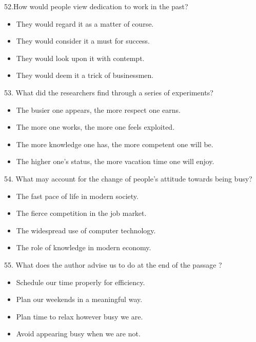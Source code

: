 \documentclass[UTF8,11pt]{ctexart}
\begin{document}
52.How would people view dedication to work in the past?


\begin{itemize}[leftmargin=2em,itemsep=.2em,topsep=.4em]\item[A.] They would regard it as a matter of course.
\item[B.] They would consider it a must for success.
\item[C.] They would look upon it with contempt.
\item[D.] They would deem it a trick of businessmen.
\end{itemize}

53. What did the researchers find through a series of experiments?


\begin{itemize}[leftmargin=2em,itemsep=.2em,topsep=.4em]\item[A.] The busier one appears, the more respect one earns.
\item[B.] The more one works, the more one feels exploited.
\item[C.] The more knowledge one has, the more competent one will be.
\item[D.] The higher one’s status, the more vacation time one will enjoy.
\end{itemize}

54. What may account for the change of people’s attitude towards being busy?


\begin{itemize}[leftmargin=2em,itemsep=.2em,topsep=.4em]\item[A.] The fast pace of life in modern society.
\item[B.] The fierce competition in the job market.
\item[C.] The widespread use of computer technology.
\item[D.] The role of knowledge in modern economy.
\end{itemize}

55. What does the author advise us to do at the end of the passage ?


\begin{itemize}[leftmargin=2em,itemsep=.2em,topsep=.4em]\item[A.] Schedule our time properly for efficiency.
\item[B.] Plan our weekends in a meaningful way.
\item[C.] Plan time to relax however busy we are.
\item[D.] Avoid appearing busy when we are not.
\end{itemize}
\end{document}
